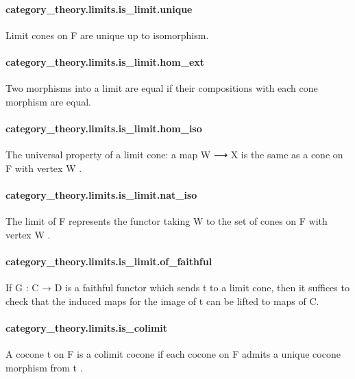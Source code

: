 \documentclass{article}
\begin{document}
\paragraph{category\_theory.limits.is\_limit.unique}
\par
Limit cones on 
\colorbox[RGB]{253,246,227}{{{{\color[RGB]{101, 123, 131} F }}}} are unique up to isomorphism.
\paragraph{category\_theory.limits.is\_limit.hom\_ext}
\par
Two morphisms into a limit are equal if their compositions with
each cone morphism are equal.
\paragraph{category\_theory.limits.is\_limit.hom\_iso}
\par
The universal property of a limit cone: a map 
\colorbox[RGB]{253,246,227}{{{{\color[RGB]{101, 123, 131} W ⟶ X }}}} is the same as
a cone on 
\colorbox[RGB]{253,246,227}{{{{\color[RGB]{101, 123, 131} F }}}} with vertex 
\colorbox[RGB]{253,246,227}{{{{\color[RGB]{101, 123, 131} W }}}}.
\paragraph{category\_theory.limits.is\_limit.nat\_iso}
\par
The limit of 
\colorbox[RGB]{253,246,227}{{{{\color[RGB]{101, 123, 131} F }}}} represents the functor taking 
\colorbox[RGB]{253,246,227}{{{{\color[RGB]{101, 123, 131} W }}}} to
the set of cones on 
\colorbox[RGB]{253,246,227}{{{{\color[RGB]{101, 123, 131} F }}}} with vertex 
\colorbox[RGB]{253,246,227}{{{{\color[RGB]{101, 123, 131} W }}}}.
\paragraph{category\_theory.limits.is\_limit.of\_faithful}
\par
If G : C → D is a faithful functor which sends t to a limit cone,
then it suffices to check that the induced maps for the image of t
can be lifted to maps of C.
\paragraph{category\_theory.limits.is\_colimit}
\par
A cocone 
\colorbox[RGB]{253,246,227}{{{{\color[RGB]{101, 123, 131} t }}}} on 
\colorbox[RGB]{253,246,227}{{{{\color[RGB]{101, 123, 131} F }}}} is a colimit cocone if each cocone on 
\colorbox[RGB]{253,246,227}{{{{\color[RGB]{101, 123, 131} F }}}} admits a unique
cocone morphism from 
\colorbox[RGB]{253,246,227}{{{{\color[RGB]{101, 123, 131} t }}}}.
\end{document}
